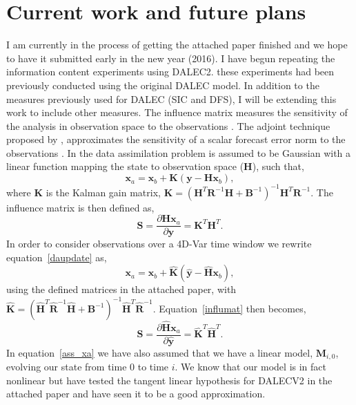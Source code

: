 \documentclass[11pt]{article}
\begin{document}
\section{Current work and future plans}

I am currently in the process of getting the attached paper finished and we hope to have it submitted early in the new year (2016). I have begun repeating the information content experiments using DALEC2. these experiments had been previously conducted using the original DALEC model. In addition to the measures previously used for DALEC (SIC and DFS), I will be extending this work to include other measures. The influence matrix measures the sensitivity of the analysis in observation space to the observations \citep{Cardinali2004}. The adjoint technique proposed by \cite{Langland2004}, approximates the sensitivity of a scalar forecast error norm to the observations . In \cite{Cardinali2004} the data assimilation problem is assumed to be Gaussian with a linear function mapping the state to observation space (\textbf{H}), such that,
\begin{equation}
\textbf{x}_{a} = \textbf{x}_{b} + \textbf{K}(\textbf{y} - \textbf{H}\textbf{x}_{b}), \label{daupdate}
\end{equation}
where \textbf{K} is the Kalman gain matrix, $\textbf{K} = (\textbf{H}^{T}\textbf{R}^{-1}\textbf{H} + \textbf{B}^{-1})^{-1}\textbf{H}^{T}\textbf{R}^{-1}$. The influence matrix is then defined as,
\begin{equation}
\textbf{S} = \frac{\partial {\mathbf{H}}\textbf{x}_a}{\partial {\textbf{y}}} = \textbf{K}^{T}\textbf{H}^{T}. \label{influmat}
\end{equation}
In order to consider observations over a 4D-Var time window we rewrite equation~\ref{daupdate} as,
\begin{equation}
\textbf{x}_{a} = \textbf{x}_{b} + \hat{\textbf{K}}(\hat{\textbf{y}} - \hat{\textbf{H}}\textbf{x}_{b}), \label{ass_xa}
\end{equation}
using the defined matrices in the attached paper, with $\hat{\textbf{K}} = (\hat{\textbf{H}}^{T}\hat{\textbf{R}}^{-1}\hat{\textbf{H}} + \textbf{B}^{-1})^{-1}\hat{\textbf{H}}^{T}\hat{\textbf{R}}^{-1}$. Equation~\ref{influmat} then becomes,
\begin{equation}
\textbf{S} = \frac{\partial {\hat{\mathbf{H}}}\textbf{x}_a}{\partial \hat{{\textbf{y}}}} = \hat{\textbf{K}}^{T}\hat{\textbf{H}}^{T}. \label{influmat2}
\end{equation}
In equation~\ref{ass_xa} we have also assumed that we have a linear model, $\mathbf{M}_{i,0}$, evolving our state from time 0 to time $i$. We know that our model is in fact nonlinear but have tested the tangent linear hypothesis for DALECV2 in the attached paper and have seen it to be a good approximation. 
\end{document}
